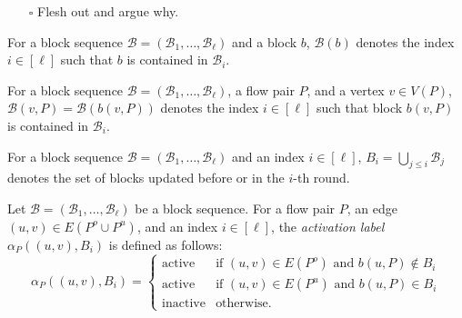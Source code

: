 \documentclass[fontsize=11pt,paper=a4]{book}
\begin{document}
\begin{itemize}
\item[{$\square$}] Flesh out and argue why.
\end{itemize}

\begin{notation}
For a block sequence \(\mathcal{B}=(\mathscr{B}_1,\dots,\mathscr{B}_{\ell})\) and a block \(b\), \(\mathcal{B}(b)\) denotes the index \(i\in[\ell]\) such that \(b\) is contained in \(\mathscr{B}_i\).
\label{org1d57970}
\end{notation}

\begin{notation}
For a block sequence \(\mathcal{B}=(\mathscr{B}_1,\dots,\mathscr{B}_{\ell})\), a flow pair \(P\), and a vertex \(v\in V(P)\), \(\mathcal{B}(v,P)=\mathcal{B}(b(v,P))\) denotes the index \(i\in[\ell]\) such that block \(b(v,P)\) is contained in \(\mathscr{B}_i\).
\label{org45f406f}
\end{notation}

\begin{notation}
For a block sequence \(\mathcal{B}=(\mathscr{B}_1,\dots,\mathscr{B}_{\ell})\) and an index \(i\in[\ell]\), \(B_i=\bigcup_{j\leq i}\mathscr{B}_j\) denotes the set of blocks updated before or in the \(i\)-th round.
\label{orge41a594}
\end{notation}

\begin{defn}
Let \(\mathcal{B}=(\mathscr{B}_1,\dots,\mathscr{B}_{\ell})\) be a block sequence.
For a flow pair \(P\), an edge \((u,v)\in E(P^o\cup P^u)\), and an index \(i\in[\ell]\), the \emph{activation label} \(\alpha_P((u,v),B_i)\) is defined as follows:
\[\alpha_P((u,v),B_i)=
\begin{cases}
\mathrm{active} & \text{if }(u,v)\in E(P^o)\text{ and }b(u,P)\notin B_i\\
\mathrm{active} & \text{if }(u,v)\in E(P^u)\text{ and }b(u,P)\in B_i\\
\mathrm{inactive} & \text{otherwise}.
\end{cases}\]
\label{org4ed0822}
\end{defn}
\end{document}
